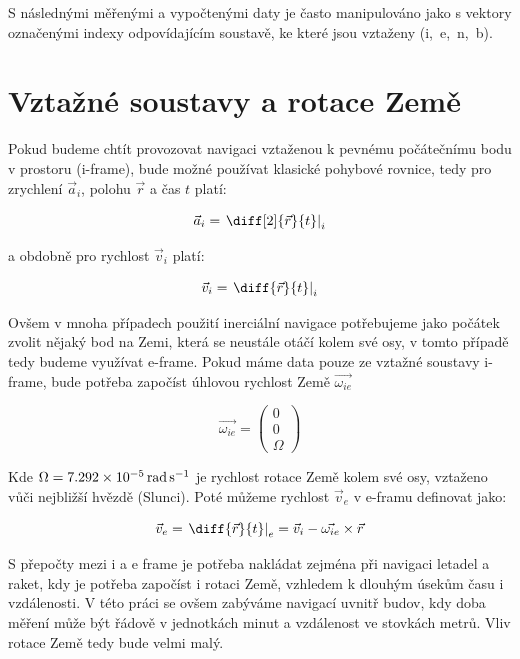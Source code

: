 S následnými měřenými a vypočtenými daty je často manipulováno jako s vektory označenými indexy odpovídajícím soustavě, ke které jsou vztaženy (i,~e,~n,~b).

\section{Vztažné soustavy a rotace Země}
Pokud budeme chtít provozovat navigaci vztaženou k pevnému počátečnímu bodu v prostoru (i-frame), bude možné používat klasické pohybové rovnice, tedy pro zrychlení $ \vec{a}_{i} $, polohu $ \vec{r} $ a čas $ t $ platí: \cite{Tittertonc2004} 

\begin{equation} \label{eq:aiDiff}
\vec{a}_{i} = \left. \diff[2]{\vec{r}}{t} \right|_{i}
\end{equation}

a obdobně pro rychlost $ \vec{v}_{i} $ platí:

\begin{equation}
\vec{v}_{i} = \left. \diff{\vec{r}}{t} \right|_{i}
\end{equation}

Ovšem v mnoha případech použití inerciální navigace potřebujeme jako počátek zvolit nějaký bod na Zemi, která se neustále otáčí kolem své osy, v tomto případě tedy budeme využívat e-frame. Pokud máme data pouze ze vztažné soustavy i-frame, bude potřeba započíst úhlovou rychlost Země $ \vec{\omega_{ie}} $ \cite{Tittertonc2004} 

\begin{equation}
\vec{\omega_{ie}} = \begin{pmatrix} 0 \\ 0 \\ \Omega \end{pmatrix}
\end{equation}

Kde $ \Omega = \SI{7,292E-5}{\radian\per\second}$ je rychlost rotace Země kolem své osy, vztaženo vůči nejbližší hvězdě (Slunci). Poté můžeme rychlost $ \vec{v}_{e} $ v e-framu definovat jako: \cite{Tittertonc2004} \cite{Grewal2013}

\begin{equation}
\vec{v}_{e} = \left. \diff{\vec{r}}{t} \right|_{e} = \vec{v}_{i} - \vec{\omega_{ie}} \times \vec{r}
\end{equation}

S přepočty mezi i a e frame je potřeba nakládat zejména při navigaci letadel a raket, kdy je potřeba započíst i rotaci Země, vzhledem k dlouhým úsekům času i vzdálenosti. V této práci se ovšem zabýváme navigací uvnitř budov, kdy doba měření může být řádově v jednotkách minut a vzdálenost ve stovkách metrů. Vliv rotace Země tedy bude velmi malý.

